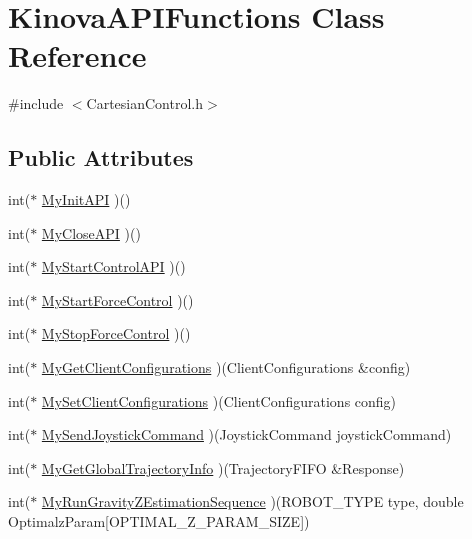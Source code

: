 \hypertarget{classKinovaAPIFunctions}{}\section{Kinova\+A\+P\+I\+Functions Class Reference}
\label{classKinovaAPIFunctions}


{\ttfamily \#include $<$Cartesian\+Control.\+h$>$}

\subsection*{Public Attributes}
\begin{DoxyCompactItemize}
\item 
int($\ast$ \hyperlink{classKinovaAPIFunctions_a32397f27720f138bdc10773d33ef9da6}{My\+Init\+A\+PI} )()
\item 
int($\ast$ \hyperlink{classKinovaAPIFunctions_ae5a2cf251b235ccf8814ad80cace0644}{My\+Close\+A\+PI} )()
\item 
int($\ast$ \hyperlink{classKinovaAPIFunctions_a60a8664e5435f4f718819f1272819fd5}{My\+Start\+Control\+A\+PI} )()
\item 
int($\ast$ \hyperlink{classKinovaAPIFunctions_a525d90a39a98a322f4c0bce674c53c6c}{My\+Start\+Force\+Control} )()
\item 
int($\ast$ \hyperlink{classKinovaAPIFunctions_af64a7c26aa505a9820da3e76d123a2a2}{My\+Stop\+Force\+Control} )()
\item 
int($\ast$ \hyperlink{classKinovaAPIFunctions_a1120b6b1e21b325a35a5931699f90062}{My\+Get\+Client\+Configurations} )(Client\+Configurations \&config)
\item 
int($\ast$ \hyperlink{classKinovaAPIFunctions_a73351e91fcffbb7ec2bf5a42bdd041f0}{My\+Set\+Client\+Configurations} )(Client\+Configurations config)
\item 
int($\ast$ \hyperlink{classKinovaAPIFunctions_ae63ffc76f91f13394d906c92984cccf3}{My\+Send\+Joystick\+Command} )(Joystick\+Command joystick\+Command)
\item 
int($\ast$ \hyperlink{classKinovaAPIFunctions_abbedf0c8f15beab985ac2084ba84715b}{My\+Get\+Global\+Trajectory\+Info} )(Trajectory\+F\+I\+FO \&Response)
\item 
int($\ast$ \hyperlink{classKinovaAPIFunctions_aa85f280eadaef3a3add5d1678ff6800d}{My\+Run\+Gravity\+Z\+Estimation\+Sequence} )(R\+O\+B\+O\+T\+\_\+\+T\+Y\+PE type, double Optimalz\+Param\mbox{[}O\+P\+T\+I\+M\+A\+L\+\_\+\+Z\+\_\+\+P\+A\+R\+A\+M\+\_\+\+S\+I\+ZE\mbox{]})

\end{DoxyCompactItemize}
